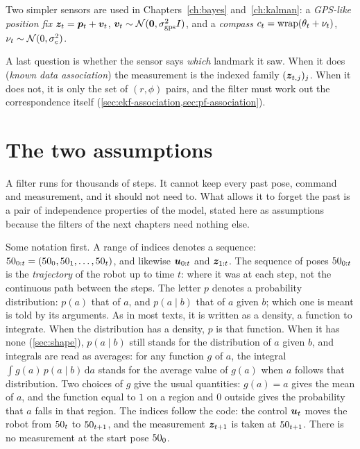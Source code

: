 Two simpler sensors are used in Chapters~\ref{ch:bayes}
and~\ref{ch:kalman}: a \emph{GPS-like position fix}
$\bm{z}_t=\bm{p}_t+\bm{v}_t$, $\bm{v}_t\sim\mathcal{N}(\bm{0},\sigma_{\mathrm{gps}}^2I)$, and
a \emph{compass} $c_t=\operatorname{wrap}(\theta_t+\nu_t)$,
$\nu_t\sim\mathcal{N}(0,\sigma_c^2)$.

A last question is whether the sensor says \emph{which} landmark it saw.
When it does (\emph{known data association}) the measurement is the
indexed family $(\bm{z}_{t,j})_j$. When it does not, it is only the set of
$(r,\phi)$ pairs, and the filter must work out the correspondence itself
(\cref{sec:ekf-association,sec:pf-association}).

\section{The two assumptions}
\label{sec:assumptions}

A filter runs for thousands of steps. It cannot keep every past pose,
command and measurement, and it should not need to. What allows it to
forget the past is a pair of independence properties of the model, stated
here as assumptions because the filters of the next chapters need nothing
else.

Some notation first. A range of indices denotes a sequence:
$50_{0:t}=(50_0,50_1,\dots,50_t)$, and likewise $\bm{u}_{0:t}$ and
$\bm{z}_{1:t}$. The sequence of poses $50_{0:t}$ is the \emph{trajectory} of
the robot up to time $t$: where it was at each step, not the continuous
path between the steps. The letter $p$ denotes a probability distribution: $p(a)$
that of $a$, and $p(a\mid b)$ that of $a$ given $b$; which one is meant is
told by its arguments. As in most texts, it is written as a density, a
function to integrate. When the distribution has a density, $p$ is that
function. When it has none (\cref{sec:shape}), $p(a\mid b)$ still stands
for the distribution of $a$ given $b$, and integrals are read as averages:
for any function $g$ of $a$, the integral
$\int g(a)\,p(a\mid b)\,\mathrm da$ stands for the average value of $g(a)$
when $a$ follows that distribution. Two choices of $g$ give the usual
quantities: $g(a)=a$ gives the mean of $a$, and the function equal to $1$
on a region and $0$ outside gives the probability that $a$ falls in that
region. The
indices follow the code: the control $\bm{u}_t$ moves
the robot from $50_t$ to $50_{t+1}$, and the measurement $\bm{z}_{t+1}$ is
taken at $50_{t+1}$. There is no measurement at the start pose $50_0$.

